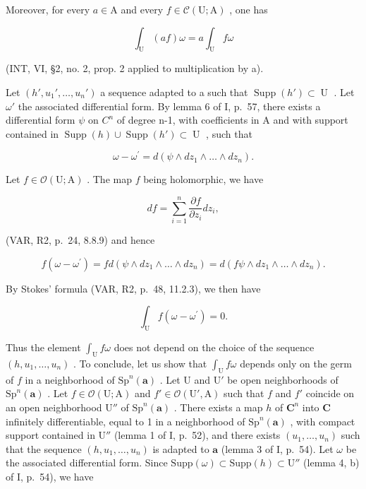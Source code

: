 Moreover, for every \(a \in \mathrm{A}\) and every \(f \in \mathcal{C}(\mathrm{U};\mathrm{A})\) , one has

\[
\int_ {\mathrm{U}} (a f) \omega = a \int_ {\mathrm{U}} f \omega
\]

(INT, VI, §2, no. 2, prop. 2 applied to multiplication by a).

Let \((h', u_{1}', \ldots, u_{n}')\) a sequence adapted to a such that \(\operatorname{Supp}(h') \subset \operatorname{U}\) . Let \(\omega'\) the associated differential form. By lemma 6 of I, p.~57, there exists a differential form \(\psi\) on \(C^{n}\) of degree n-1, with coefficients in A and with support contained in \(\operatorname{Supp}(h) \cup \operatorname{Supp}(h') \subset \operatorname{U}\) , such that

\[
\omega - \omega^ {\prime} = d (\psi \wedge d z _ {1} \wedge \dots \wedge d z _ {n}).
\]

Let \(f \in \mathcal{O}(\mathrm{U};\mathrm{A})\) . The map \(f\) being holomorphic, we have

\[
d f = \sum_ {i = 1} ^ {n} \frac {\partial f}{\partial z _ {i}} d z _ {i},
\]

(VAR, R2, p.~24, 8.8.9) and hence

\[
f \left(\omega - \omega^ {\prime}\right) = f d \left(\psi \wedge d z _ {1} \wedge \dots \wedge d z _ {n}\right) = d \left(f \psi \wedge d z _ {1} \wedge \dots \wedge d z _ {n}\right).
\]

By Stokes' formula (VAR, R2, p.~48, 11.2.3), we then have

\[
\int_ {\mathrm{U}} f (\omega - \omega^ {\prime}) = 0.
\]

Thus the element \(\int_{\mathrm{U}} f\omega\) does not depend on the choice of the sequence \((h, u_1, \ldots, u_n)\) . To conclude, let us show that \(\int_{\mathrm{U}} f\omega\) depends only on the germ of \(f\) in a neighborhood of \(\mathrm{Sp}^n(\boldsymbol{a})\) . Let U and \(\mathrm{U}'\) be open neighborhoods of \(\mathrm{Sp}^n(\boldsymbol{a})\) . Let \(f \in \mathcal{O}(\mathrm{U}; \mathrm{A})\) and \(f' \in \mathcal{O}(\mathrm{U}', \mathrm{A})\) such that \(f\) and \(f'\) coincide on an open neighborhood \(\mathrm{U}''\) of \(\mathrm{Sp}^n(\boldsymbol{a})\) . There exists a map \(h\) of \(\mathbf{C}^n\) into \(\mathbf{C}\) infinitely differentiable, equal to 1 in a neighborhood of \(\mathrm{Sp}^n(\boldsymbol{a})\) , with compact support contained in \(\mathrm{U}''\) (lemma 1 of I, p.~52), and there exists \((u_1, \ldots, u_n)\) such that the sequence \((h, u_1, \ldots, u_n)\) is adapted to \(\boldsymbol{a}\) (lemma 3 of I, p.~54). Let \(\omega\) be the associated differential form. Since \(\mathrm{Supp}(\omega) \subset \mathrm{Supp}(h) \subset \mathrm{U}''\) (lemma 4, b) of I, p.~54), we have

